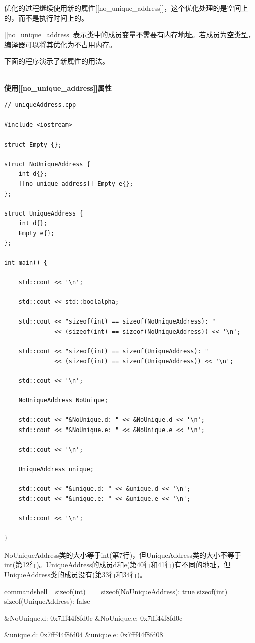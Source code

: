 优化的过程继续使用新的属性[[no\_unique\_address]]，这个优化处理的是空间上的，而不是执行时间上的。


[[no\_unique\_address]]表示类中的成员变量不需要有内存地址。若成员为空类型，编译器可以将其优化为不占用内存。

下面的程序演示了新属性的用法。

\hspace*{\fill} \\ %
\noindent
\textbf{使用[[no\_unique\_address]]属性}
\begin{lstlisting}[style=styleCXX]
// uniqueAddress.cpp

#include <iostream>

struct Empty {};

struct NoUniqueAddress {
	int d{};
	[[no_unique_address]] Empty e{};
};

struct UniqueAddress {
	int d{};
	Empty e{};
};

int main() {

	std::cout << '\n';
	
	std::cout << std::boolalpha;
	
	std::cout << "sizeof(int) == sizeof(NoUniqueAddress): "
			  << (sizeof(int) == sizeof(NoUniqueAddress)) << '\n';
	
	std::cout << "sizeof(int) == sizeof(UniqueAddress): "
			  << (sizeof(int) == sizeof(UniqueAddress)) << '\n';
	
	std::cout << '\n';
	
	NoUniqueAddress NoUnique;
	
	std::cout << "&NoUnique.d: " << &NoUnique.d << '\n';
	std::cout << "&NoUnique.e: " << &NoUnique.e << '\n';
	
	std::cout << '\n';
	
	UniqueAddress unique;
	
	std::cout << "&unique.d: " << &unique.d << '\n';
	std::cout << "&unique.e: " << &unique.e << '\n';
	
	std::cout << '\n';

}
\end{lstlisting}

NoUniqueAddress类的大小等于int(第7行)，但UniqueAddress类的大小不等于int(第12行)。UniqueAddress的成员d和e(第40行和41行)有不同的地址，但UniqueAddress类的成员没有(第33行和34行)。

\begin{tcblisting}{commandshell={}}
sizeof(int) == sizeof(NoUniqueAddress): true
sizeof(int) == sizeof(UniqueAddress): false

&NoUnique.d: 0x7fff44f8fd0c
&NoUnique.e: 0x7fff44f8fd0c

&unique.d: 0x7fff44f8fd04
&unique.e: 0x7fff44f8fd08
\end{tcblisting}

